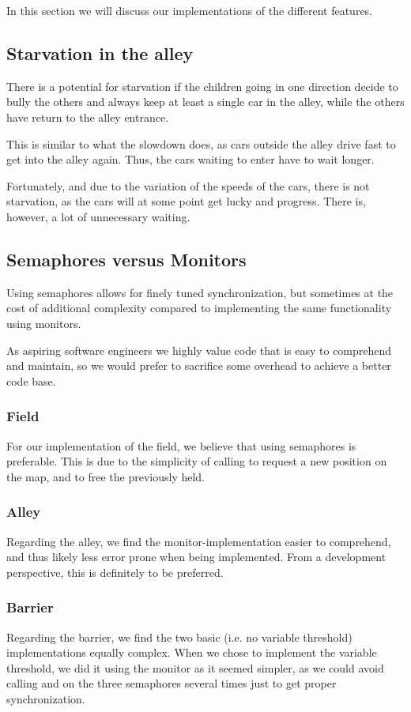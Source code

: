 
In this section we will discuss our implementations of the different
features.

\subsection{Starvation in the alley}
There is a potential for starvation if the children going in one
direction decide to bully the others and always keep at least a single
car in the alley, while the others have return to the alley entrance.

This is similar to what the slowdown does, as cars outside the alley
drive fast to get into the alley again. Thus, the cars waiting to
enter have to wait longer.

Fortunately, and due to the variation of the speeds of the cars, there
is not starvation, as the cars will at some point get lucky and
progress. There is, however, a lot of unnecessary waiting.

\subsection{Semaphores versus Monitors}
\label{sub:disc-sema-moni}
Using semaphores allows for finely tuned synchronization, but
sometimes at the cost of additional complexity compared to
implementing the same functionality using monitors.

As aspiring software engineers we highly value code that is easy to
comprehend and maintain, so we would prefer to sacrifice some overhead
to achieve a better code base.

\subsubsection{Field}
\label{subsub:disc-field}
For our implementation of the field, we believe that using semaphores
is preferable. This is due to the simplicity of calling  to
request a new position on the map, and  to free the
previously held.

\subsubsection{Alley}
\label{subsub:disc-alley}
Regarding the alley, we find the monitor-implementation easier to
comprehend, and thus likely less error prone when being
implemented. From a development perspective, this is definitely to be
preferred.

\subsubsection{Barrier}
\label{subsub:disc-barrier}
Regarding the barrier, we find the two basic (i.e. no variable
threshold) implementations equally complex. When we chose to implement
the variable threshold, we did it using the monitor as it seemed
simpler, as we could avoid calling  and  on the
three semaphores several times just to get proper synchronization.
